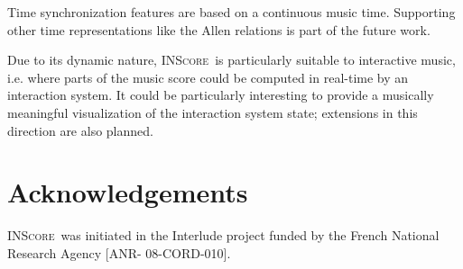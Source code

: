 \documentclass[11pt,letterpaper]{article}
\newcommand{\inscore}		{\textsc{\small INScore}}
\begin{document}
Time synchronization features are based on a continuous music time. Supporting other time representations like the Allen relations \cite{Allen:1983:MKT:182.358434} is part of the future work.

Due to its dynamic nature, \inscore\ is particularly suitable to interactive music, i.e. where parts of the music score could be computed in real-time by an interaction system. It could be particularly interesting to provide a musically meaningful visualization of the interaction system state; extensions in this direction are also planned.



\section{Acknowledgements}

\inscore\ was initiated in the Interlude project funded by the French National Research Agency [ANR- 08-CORD-010].




\end{document}

